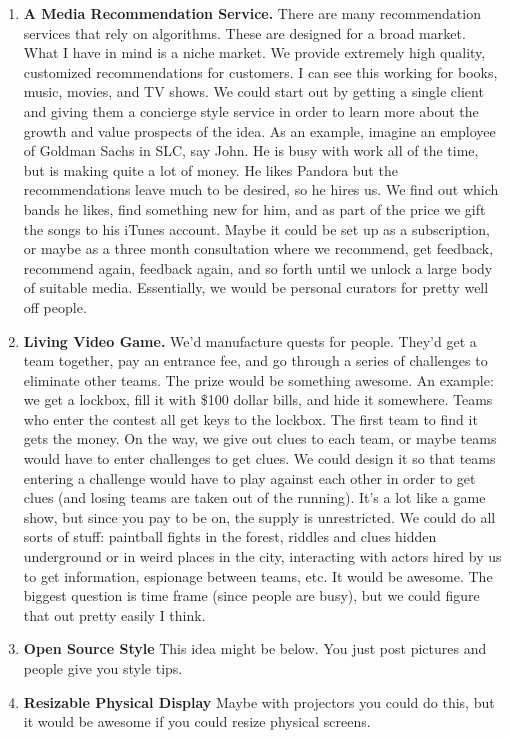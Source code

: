 \documentclass[paper=a4, fontsize=11pt]{scrartcl} %
\numberwithin{equation}{section} %
\numberwithin{figure}{section} %
\numberwithin{table}{section} %
\begin{document}
\begin{enumerate}
\item \textbf{A Media Recommendation Service.}  There are many recommendation services that rely on algorithms.  These are designed for a broad market.  What I have in mind is a niche market.  We provide extremely high quality, customized recommendations for customers.  I can see this working for books, music, movies, and TV shows.  We could start out by getting a single client and giving them a concierge style service in order to learn more about the growth and value prospects of the idea.  As an example, imagine an employee of Goldman Sachs in SLC, say John.  He is busy with work all of the time, but is making quite a lot of money.  He likes Pandora but the recommendations leave much to be desired, so he hires us.  We find out which bands he likes, find something new for him, and as part of the price we gift the songs to his iTunes account.  Maybe it could be set up as a subscription, or maybe as a three month consultation where we recommend, get feedback, recommend again, feedback again, and so forth until we unlock a large body of suitable media.  Essentially, we would be personal curators for pretty well off people.

\item \textbf{Living Video Game.}  We'd manufacture quests for people.  They'd get a team together, pay an entrance fee, and go through a series of challenges to eliminate other teams.  The prize would be something awesome.  An example: we get a lockbox, fill it with \$100 dollar bills, and hide it somewhere.  Teams who enter the contest all get keys to the lockbox.  The first team to find it gets the money.  On the way, we give out clues to each team, or maybe teams would have to enter challenges to get clues.  We could design it so that teams entering a challenge would have to play against each other in order to get clues (and losing teams are taken out of the running).  It's a lot like a game show, but since you pay to be on, the supply is unrestricted.  We could do all sorts of stuff: paintball fights in the forest, riddles and clues hidden underground or in weird places in the city, interacting with actors hired by us to get information, espionage between teams, etc.  It would be awesome.  The biggest question is time frame (since people are busy), but we could figure that out pretty easily I think. 

\item \textbf{Open Source Style}  This idea might be below.  You just post pictures and people give you style tips.  
\item \textbf{Resizable Physical Display}  Maybe with projectors you could do this, but it would be awesome if you could resize physical screens.


\end{enumerate}
\end{document}
